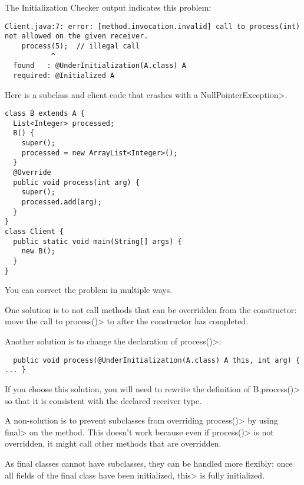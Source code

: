The Initialization Checker output indicates this problem:

\begin{Verbatim}
Client.java:7: error: [method.invocation.invalid] call to process(int) not allowed on the given receiver.
    process(5);  // illegal call
           ^
  found   : @UnderInitialization(A.class) A
  required: @Initialized A
\end{Verbatim}

Here is a subclass and client code that crashes with a \<NullPointerException>.

\begin{Verbatim}
class B extends A {
  List<Integer> processed;
  B() {
    super();
    processed = new ArrayList<Integer>();
  }
  @Override
  public void process(int arg) {
    super();
    processed.add(arg);
  }
}
class Client {
  public static void main(String[] args) {
    new B();
  }
}
\end{Verbatim}

You can correct the problem in multiple ways.

One solution is to not call methods that can be overridden from the
constructor:  move the call to \<process()> to after the constructor has
completed.

Another solution is to change the declaration of \<process()>:

\begin{Verbatim}
  public void process(@UnderInitialization(A.class) A this, int arg) { ... }
\end{Verbatim}

If you choose this solution, you will need to rewrite the definition of
\<B.process()> so that it is consistent with the declared receiver type.

A non-solution is to prevent subclasses from overriding \<process()> by
using \<final> on the method.  This doesn't work because even if
\<process()> is not overridden, it might call other methods that are
overridden.

As final classes cannot have subclasses, they can be handled more
flexibly: once all fields of the final class have been
initialized, \<this> is fully initialized.




